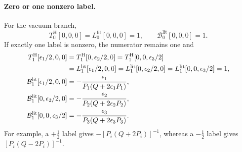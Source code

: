 \documentclass[11pt]{article}
\begin{document}
\paragraph{Zero or one nonzero label.}
For the vacuum branch,
\begin{equation}
 T_0^{\mathrm H}[0,0,0]
 =L_0^{\mathrm{lit}}[0,0,0]=1,
 \qquad
 \mathcal B_0^{\mathrm{lit}}[0,0,0]=1.
 \label{eq:small-n-vacuum}
\end{equation}
If exactly one label is nonzero, the numerator remains one and
\begin{align}
 T_1^{\mathrm H}[\epsilon_1/2,0,0]
 &=T_1^{\mathrm H}[0,\epsilon_2/2,0]
 =T_1^{\mathrm H}[0,0,\epsilon_3/2]
 \notag\\
 &=L_1^{\mathrm{lit}}[\epsilon_1/2,0,0]
 =L_1^{\mathrm{lit}}[0,\epsilon_2/2,0]
 =L_1^{\mathrm{lit}}[0,0,\epsilon_3/2]=1,
 \notag\\
 \mathcal B_1^{\mathrm{lit}}[\epsilon_1/2,0,0]
 &=-\frac{\epsilon_1}
 {P_1(Q+2\epsilon_1P_1)},
 \notag\\
 \mathcal B_1^{\mathrm{lit}}[0,\epsilon_2/2,0]
 &=-\frac{\epsilon_2}
 {P_2(Q+2\epsilon_2P_2)},
 \notag\\
 \mathcal B_1^{\mathrm{lit}}[0,0,\epsilon_3/2]
 &=-\frac{\epsilon_3}
 {P_3(Q+2\epsilon_3P_3)}.
 \label{eq:small-n-one-leg}
\end{align}
For example, a \(+\frac12\) label gives
\(-[P_i(Q+2P_i)]^{-1}\), whereas a \(-\frac12\) label gives
\([P_i(Q-2P_i)]^{-1}\).
\end{document}
